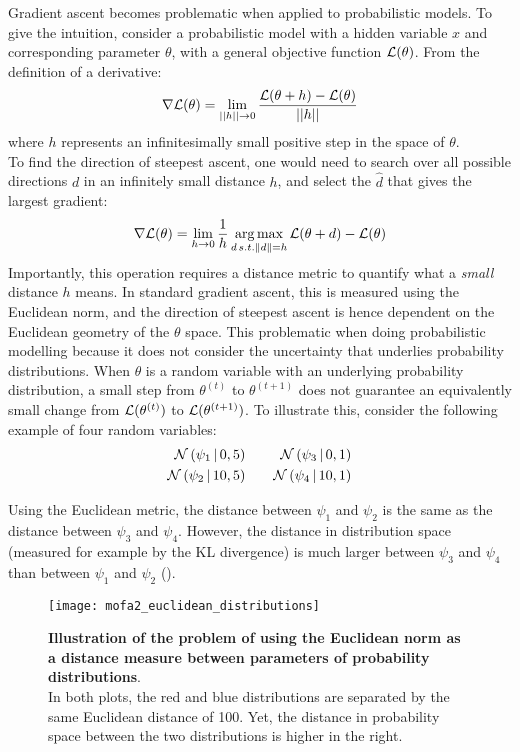 Gradient ascent becomes problematic when applied to probabilistic models. To give the intuition, consider a probabilistic model with a hidden variable $x$ and corresponding parameter $\theta$, with a general objective function $\mathcal{L}(\theta)$. From the definition of a derivative:
\[
	\nabla \mathcal{L}(\theta) = \lim_{||h||\to0} \frac{\mathcal{L}(\theta + h) - \mathcal{L}(\theta)}{||h||}
\]
where $h$ represents an infinitesimally small positive step in the space of $\theta$.\\
To find the direction of steepest ascent, one would need to search over all possible directions $d$ in an infinitely small distance $h$, and select the $\hat{d}$ that gives the largest gradient:
\[
\nabla \mathcal{L}(\theta) = \lim_{h\to0} \frac{1}{h}\operatorname*{arg\,max}_{d \, s.t. \|d\|=h} \mathcal{L}(\theta+d) - \mathcal{L}(\theta)
\]
Importantly, this operation requires a distance metric to quantify what a \textit{small} distance $h$ means. In standard gradient ascent, this is measured using the Euclidean norm, and the direction of steepest ascent is hence dependent on the Euclidean geometry of the $\theta$ space. This problematic when doing probabilistic modelling because it does not consider the uncertainty that underlies probability distributions. When $\theta$ is a random variable with an underlying probability distribution, a small step from $\theta^{(t)}$ to $\theta^{(t+1)}$ does not guarantee an equivalently small change from $\mathcal{L}(\theta^{(t)})$ to $\mathcal{L}(\theta^{(t+1)})$. To illustrate this, consider the following example of four random variables:
\begin{equation}
	\begin{split}
		 \mathcal{N}\left(\psi_1 \,|\, 0,5\right) \\
		 \mathcal{N}\left(\psi_2 \,|\, 10,5\right)
	\end{split}
	\qquad
	\begin{split}
		\mathcal{N}\left(\psi_3 \,|\, 0,1\right) \\
		\mathcal{N}\left(\psi_4 \,|\, 10,1\right)
	\end{split}
\end{equation}

Using the Euclidean metric, the distance between $\psi_1$ and $\psi_2$ is the same as the distance between $\psi_3$ and $\psi_4$. However, the distance in distribution space (measured for example by the KL divergence) is much larger between $\psi_3$ and $\psi_4$ than between $\psi_1$ and $\psi_2$ ().

\begin{figure}[!h]
	\begin{center}
		\texttt{[image: mofa2\_euclidean\_distributions]}
		\caption{\textbf{Illustration of the problem of using the Euclidean norm as a distance measure between parameters of probability distributions}.\\
		In both plots, the red and blue distributions are separated by the same Euclidean distance of 100. Yet, the distance in probability space between the two distributions is higher in the right.
		}
		\label{fig:mofa2_euclidean_distributions}
	\end{center}
\end{figure}

